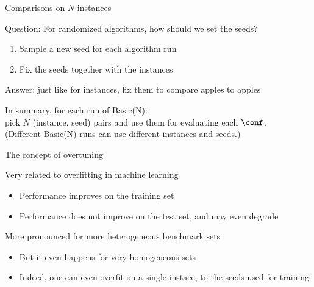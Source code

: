 \begin{frame}[c]{Comparisons on $N$ instances}

Question: For randomized algorithms, how should we set the seeds? \hands
\begin{enumerate}
\item Sample a new seed for each algorithm run
\item Fix the seeds together with the instances
\end{enumerate}
\bigskip
\pause
Answer: just like for instances, fix them to compare apples to apples

\bigskip
\pause
In summary, for each run of Basic(N): \\pick $N$ (instance, seed) pairs and use them for evaluating each $\conf$.\\
\pause
(Different Basic(N) runs can use different instances and seeds.)

\end{frame}


\begin{frame}[c]{The concept of overtuning}

Very related to overfitting in machine learning 
\begin{itemize}
\item Performance improves on the training set
\item Performance does not improve on the test set, and may even degrade
\end{itemize}	

\pause
\medskip

More pronounced for more heterogeneous benchmark sets 
\begin{itemize}
\item But it even happens for very homogeneous sets
\item Indeed, one can even overfit on a single instace, to the \alert{seeds} used for training 
\end{itemize}	

\end{frame}

